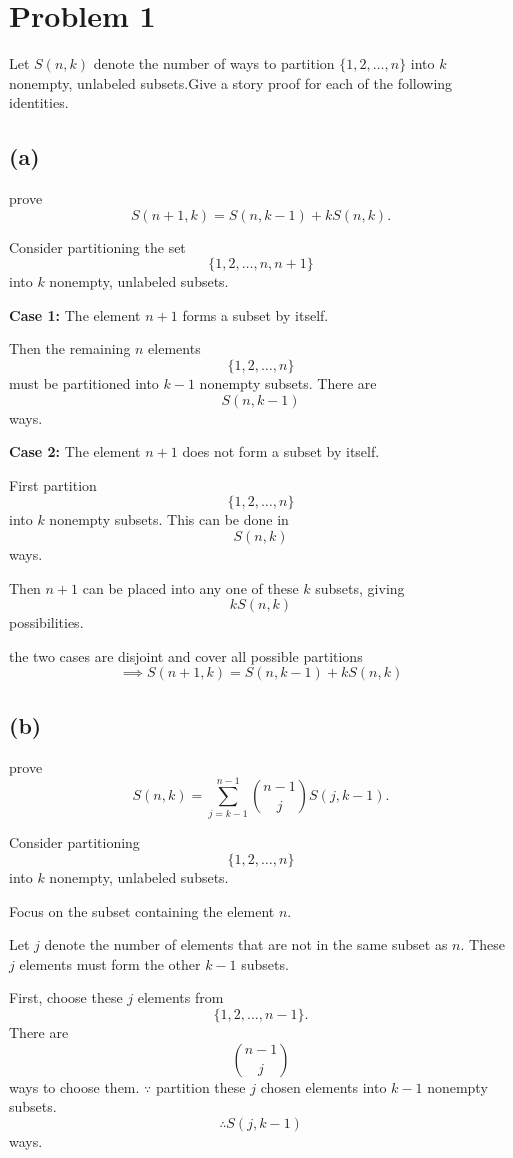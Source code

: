 \documentclass{article}
\begin{document}
\section*{Problem 1}

Let $S(n,k)$ denote the number of ways to partition
$\{1,2,\ldots,n\}$ into $k$ nonempty, unlabeled subsets.Give a story proof for each of the following identities.


\subsection*{(a)}

prove
\[
S(n+1,k)=S(n,k-1)+kS(n,k).
\]

Consider partitioning the set
\[
\{1,2,\ldots,n,n+1\}
\]
into $k$ nonempty, unlabeled subsets.

\textbf{Case 1:} The element $n+1$ forms a subset by itself.

Then the remaining $n$ elements
\[
\{1,2,\ldots,n\}
\]
must be partitioned into $k-1$ nonempty subsets. There are
\[
S(n,k-1)
\]
ways.

\textbf{Case 2:} The element $n+1$ does not form a subset by itself.

First partition
\[
\{1,2,\ldots,n\}
\]
into $k$ nonempty subsets. This can be done in
\[
S(n,k)
\]
ways.

Then $n+1$ can be placed into any one of these $k$ subsets, giving
\[
kS(n,k)
\]
possibilities.

the two cases are disjoint and cover all possible partitions
\[
\implies
S(n+1,k)=S(n,k-1)+kS(n,k)
\]

\subsection*{(b)}

prove 
\[
S(n,k)=
\sum_{j=k-1}^{n-1}
\binom{n-1}{j}S(j,k-1).
\]

Consider partitioning
\[
\{1,2,\ldots,n\}
\]
into $k$ nonempty, unlabeled subsets.

Focus on the subset containing the element $n$.

Let $j$ denote the number of elements that are not in the same subset as $n$.
These $j$ elements must form the other $k-1$ subsets.

First, choose these $j$ elements from
\[
\{1,2,\ldots,n-1\}.
\]
There are
\[
\binom{n-1}{j}
\]
ways to choose them.
$\because$  partition these $j$ chosen elements into $k-1$ nonempty subsets.
\[
\therefore
S(j,k-1)
\]
ways.
\end{document}
